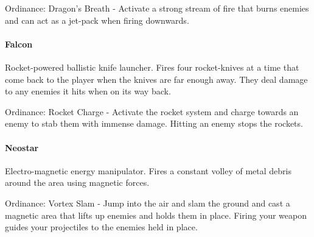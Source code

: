 \documentclass[../Main.tex]{subfiles}
\begin{document}
Ordinance: Dragon's Breath - Activate a strong stream of fire that burns enemies and can act as a jet-pack when firing downwards.

\paragraph{Falcon}

Rocket-powered ballistic knife launcher. Fires four rocket-knives at a time that come back to the player when the knives are far enough away. They deal damage to any enemies it hits when on its way back.

Ordinance: Rocket Charge - Activate the rocket system and charge towards an enemy to stab them with immense damage. Hitting an enemy stops the rockets. 

\paragraph{Neostar}

Electro-magnetic energy manipulator. Fires a constant volley of metal debris around the area using magnetic forces.

Ordinance: Vortex Slam - Jump into the air and slam the ground and cast a magnetic area that lifts up enemies and holds them in place. Firing your weapon guides your projectiles to the enemies held in place.
\end{document}
